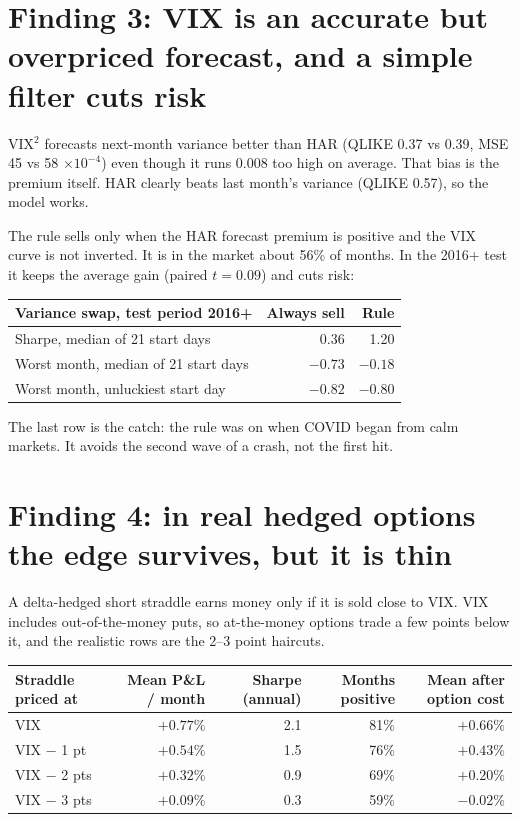 \documentclass[10pt]{article}
\begin{document}
\section*{Finding 3: VIX is an accurate but overpriced forecast, and a simple filter cuts risk}
VIX$^2$ forecasts next-month variance better than HAR (QLIKE 0.37 vs 0.39, MSE 45 vs 58 $\times 10^{-4}$) even though it runs 0.008 too high on average. That bias is the premium itself. HAR clearly beats last month's variance (QLIKE 0.57), so the model works.

The rule sells only when the HAR forecast premium is positive and the VIX curve is not inverted. It is in the market about 56\% of months. In the 2016+ test it keeps the average gain (paired $t = 0.09$) and cuts risk:

\begin{center}
\begin{tabular}{lrr}
\toprule
Variance swap, test period 2016+ & Always sell & Rule \\
\midrule
Sharpe, median of 21 start days & 0.36 & 1.20 \\
Worst month, median of 21 start days & $-0.73$ & $-0.18$ \\
Worst month, unluckiest start day & $-0.82$ & $-0.80$ \\
\bottomrule
\end{tabular}
\end{center}

The last row is the catch: the rule was on when COVID began from calm markets. It avoids the second wave of a crash, not the first hit.

\section*{Finding 4: in real hedged options the edge survives, but it is thin}
A delta-hedged short straddle earns money only if it is sold close to VIX. VIX includes out-of-the-money puts, so at-the-money options trade a few points below it, and the realistic rows are the 2--3 point haircuts.

\begin{center}
\begin{tabular}{lrrrr}
\toprule
Straddle priced at & Mean P\&L / month & Sharpe (annual) & Months positive & Mean after option cost \\
\midrule
VIX              & $+0.77\%$ & 2.1 & 81\% & $+0.66\%$ \\
VIX $-$ 1 pt     & $+0.54\%$ & 1.5 & 76\% & $+0.43\%$ \\
VIX $-$ 2 pts    & $+0.32\%$ & 0.9 & 69\% & $+0.20\%$ \\
VIX $-$ 3 pts    & $+0.09\%$ & 0.3 & 59\% & $-0.02\%$ \\
\bottomrule
\end{tabular}
\end{center}
\end{document}

